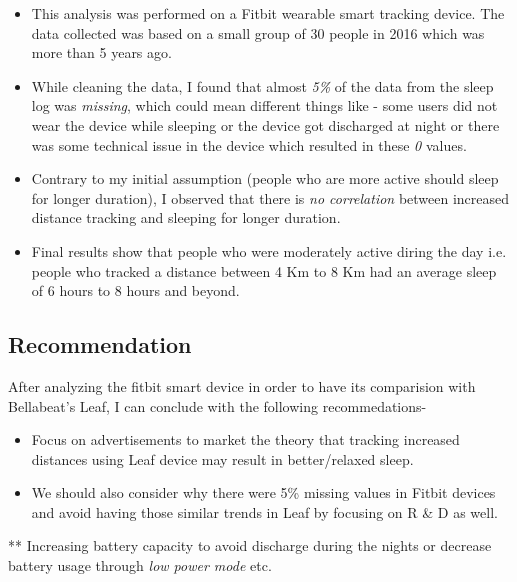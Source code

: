 \documentclass[
]{article}
\begin{document}
\begin{itemize}
\item
  This analysis was performed on a Fitbit wearable smart tracking
  device. The data collected was based on a small group of 30 people in
  2016 which was more than 5 years ago.
\item
  While cleaning the data, I found that almost \emph{5\%} of the data
  from the sleep log was \emph{missing}, which could mean different
  things like - some users did not wear the device while sleeping or the
  device got discharged at night or there was some technical issue in
  the device which resulted in these \emph{0} values.
\item
  Contrary to my initial assumption (people who are more active should
  sleep for longer duration), I observed that there is \emph{no
  correlation} between increased distance tracking and sleeping for
  longer duration.
\item
  Final results show that people who were moderately active diring the
  day i.e. people who tracked a distance between 4 Km to 8 Km had an
  average sleep of 6 hours to 8 hours and beyond.
\end{itemize}

\hypertarget{recommendation}{%
\subsection{Recommendation}\label{recommendation}}

After analyzing the fitbit smart device in order to have its comparision
with Bellabeat's Leaf, I can conclude with the following recommedations-

\begin{itemize}
\item
  Focus on advertisements to market the theory that tracking increased
  distances using Leaf device may result in better/relaxed sleep.
\item
  We should also consider why there were 5\% missing values in Fitbit
  devices and avoid having those similar trends in Leaf by focusing on R
  \& D as well.
\end{itemize}

** Increasing battery capacity to avoid discharge during the nights or
decrease battery usage through \emph{low power mode} etc.
\end{document}

